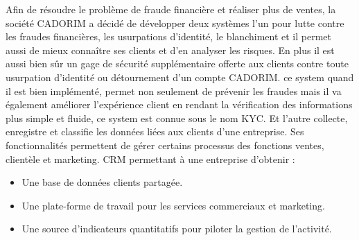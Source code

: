 Afin de résoudre le problème de fraude financière et réaliser plus de ventes, la société CADORIM a décidé de développer deux systèmes l'un pour lutte contre les fraudes financières, les usurpations d’identité, le blanchiment et il permet aussi de mieux connaître ses clients et d’en analyser les risques.
En plus il  est aussi bien sûr un gage de sécurité supplémentaire offerte aux clients contre toute usurpation d’identité ou détournement d’un compte CADORIM. ce system quand il est bien implémenté, permet non seulement de prévenir les fraudes mais il va également améliorer l’expérience client en  rendant la vérification des informations plus simple et fluide, ce system est connue sous le nom KYC.
Et l'autre collecte, enregistre et classifie les données liées aux clients d’une entreprise. Ses fonctionnalités permettent de gérer certains processus des fonctions ventes, clientèle et marketing.
CRM permettant à une entreprise d'obtenir :
\begin{itemize}[label=$\ast$]
\item Une base de données clients partagée.
\item Une plate-forme de travail pour les services commerciaux et marketing.
\item Une source d’indicateurs quantitatifs pour piloter la gestion de l’activité.
\end{itemize}

